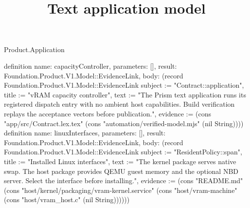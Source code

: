 \begin{lexlean}{Product.Application}
\title{Text application model}
\begin{semanticmodule}
definition{
  name: capacityController, parameters: [], result: Foundation.Product.V1.Model::EvidenceLink,
  body: (record Foundation.Product.V1.Model::EvidenceLink {subject := "Contract::application", title := "vRAM capacity controller", text := "The Prism text application runs its registered dispatch entry with no ambient host capabilities. Build verification replays the acceptance vectors before publication.", evidence := (cons "app/src/Contract.lex.tex" (cons "automation/verified-model.mjs" (nil String)))})
}
definition{
  name: linuxInterfaces, parameters: [], result: Foundation.Product.V1.Model::EvidenceLink,
  body: (record Foundation.Product.V1.Model::EvidenceLink {subject := "ResidentPolicy::span", title := "Installed Linux interfaces", text := "The kernel package serves native swap. The host package provides QEMU guest memory and the optional NBD server. Select the interface before installing.", evidence := (cons "README.md" (cons "host/kernel/packaging/vram-kernel.service" (cons "host/vram-machine" (cons "host/vram_host.c" (nil String)))))})
}
\end{semanticmodule}
\end{lexlean}
